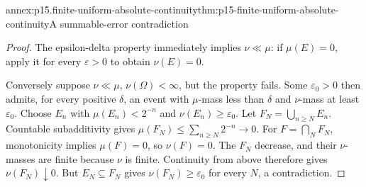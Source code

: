 \begin{annexitem}{annex:p15.finite-uniform-absolute-continuity}{thm:p15-finite-uniform-absolute-continuity}{A summable-error contradiction}
\begin{proof}
The epsilon-delta property immediately implies \(\nu\ll\mu\):
if \(\mu(E)=0\), apply it for every \(\varepsilon>0\) to obtain
\(\nu(E)=0\).

Conversely suppose \(\nu\ll\mu\), \(\nu(\Omega)<\infty\), but
the property fails. Some \(\varepsilon_0>0\) then admits, for every
positive \(\delta\), an event with \(\mu\)-mass less than \(\delta\)
and \(\nu\)-mass at least \(\varepsilon_0\).
Choose \(E_n\) with
\(\mu(E_n)<2^{-n}\) and \(\nu(E_n)\geq\varepsilon_0\).
Let \(F_N=\bigcup_{n\geq N}E_n\). Countable subadditivity gives
\(\mu(F_N)\leq\sum_{n\geq N}2^{-n}\to0\).
For \(F=\bigcap_NF_N\), monotonicity implies \(\mu(F)=0\),
so \(\nu(F)=0\).
The \(F_N\) decrease, and their \(\nu\)-masses are finite because
\(\nu\) is finite. Continuity from above therefore gives
\(\nu(F_N)\downarrow0\).
But \(E_N\subseteq F_N\) gives \(\nu(F_N)\geq\varepsilon_0\)
for every \(N\), a contradiction.
\end{proof}
\end{annexitem}

